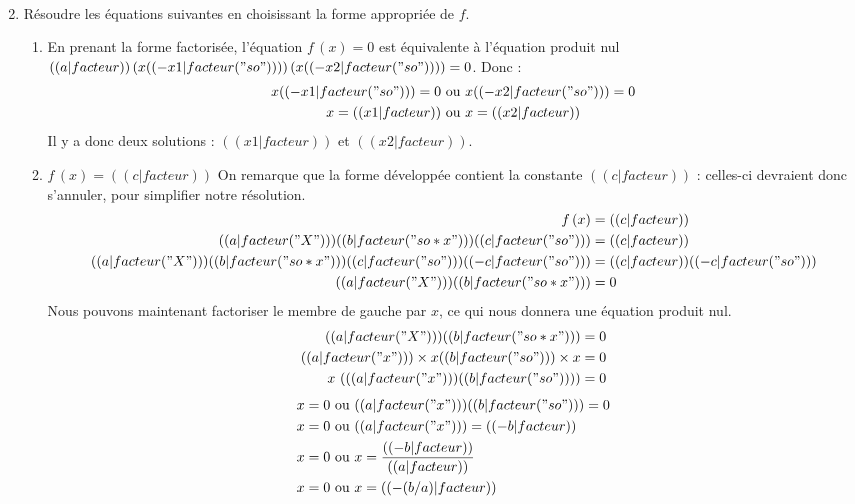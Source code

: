 \begin{enumerate}
\begin{enumerate}
\begin{align*}
        \end{align*}
\end{enumerate}
\item Résoudre les équations suivantes en choisissant la forme appropriée de $f$.
\begin{enumerate}
\item En prenant la forme factorisée, l'équation $f\,(x)=0$ est équivalente à l'équation produit nul $(( a|facteur ))\,(x (( -x1|facteur("so") )) )\,(x (( -x2|facteur("so") )) ) = 0$. Donc :
\begin{align*}
x (( -x1|facteur("so") ))=0 &\text{ ou } x (( -x2|facteur("so") ))=0 \\
x=(( x1|facteur )) &\text{ ou } x=(( x2|facteur ))
\end{align*}
Il y a donc deux solutions : $(( x1|facteur ))$ et $(( x2|facteur ))$.
\item $f\,(x)=(( c|facteur ))$ On remarque que la forme développée contient la constante $(( c|facteur ))$ : celles-ci devraient donc s'annuler, pour simplifier notre résolution.
\begin{align*}
f\,(x) &= (( c|facteur )) \\
(( a|facteur("X") )) (( b|facteur("so*x") )) (( c|facteur("so") )) &= (( c|facteur )) \\
(( a|facteur("X") )) (( b|facteur("so*x") )) (( c|facteur("so") )) (( -c|facteur("so") )) &= (( c|facteur )) (( -c|facteur("so") )) \\
(( a|facteur("X") )) (( b|facteur("so*x") )) &= 0 \\
\end{align*}
Nous pouvons maintenant factoriser le membre de gauche par $x$, ce qui nous donnera une équation produit nul.
\begin{align*}
(( a|facteur("X") )) (( b|facteur("so*x") )) &= 0 \\
(( a|facteur("x") ))\times{} x (( b|facteur("so") ))\times{} x &= 0 \\
x\,\left( (( a|facteur("x") )) (( b|facteur("so") )) \right) &= 0 \\
\end{align*}
\begin{align*}
x =0 &\text{ ou } (( a|facteur("x") )) (( b|facteur("so") ))=0 \\
x =0 &\text{ ou } (( a|facteur("x") )) =(( -b|facteur )) \\
x =0 &\text{ ou } x = \frac{(( -b|facteur ))}{(( a|facteur ))} \\
x =0 &\text{ ou } x = (( -(b/a)|facteur )) \\

\end{align*}
\end{enumerate}
\end{enumerate}
